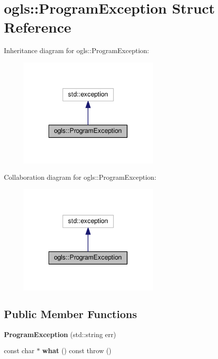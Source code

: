 \hypertarget{structogls_1_1ProgramException}{\section{ogls\-:\-:Program\-Exception Struct Reference}
\label{structogls_1_1ProgramException}
}


Inheritance diagram for ogls\-:\-:Program\-Exception\-:\nopagebreak
\begin{figure}[H]
\begin{center}
\leavevmode
\includegraphics[width=200pt]{d2/d5f/structogls_1_1ProgramException__inherit__graph}
\end{center}
\end{figure}


Collaboration diagram for ogls\-:\-:Program\-Exception\-:\nopagebreak
\begin{figure}[H]
\begin{center}
\leavevmode
\includegraphics[width=200pt]{d2/d29/structogls_1_1ProgramException__coll__graph}
\end{center}
\end{figure}
\subsection*{Public Member Functions}
\begin{DoxyCompactItemize}
\item 
\hypertarget{structogls_1_1ProgramException_afeaffb31d0feabdc28590e18dbdd13e2}{{\bfseries Program\-Exception} (std\-::string err)}\label{structogls_1_1ProgramException_afeaffb31d0feabdc28590e18dbdd13e2}

\item 
\hypertarget{structogls_1_1ProgramException_a82c7b3e7ba0ba7d7ff5a496741438556}{const char $\ast$ {\bfseries what} () const   throw ()}\label{structogls_1_1ProgramException_a82c7b3e7ba0ba7d7ff5a496741438556}

\end{DoxyCompactItemize}
